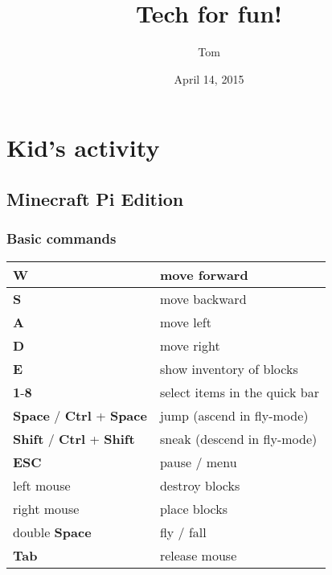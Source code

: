 \documentclass[letterpaper,10pt,english]{sphinxmanual}
\title{Tech for fun!}
\date{April 14, 2015}
\author{Tom}
\begin{document}
\maketitle
\tableofcontents
{}\label{index::doc}



\chapter{Kid's activity}
\label{index:kid-s-activity}\label{index:tech-for-fun}

\section{Minecraft Pi Edition}
\label{kid/minecraft::doc}\label{kid/minecraft:minecraft-pi-edition}

\subsection{Basic commands}
\label{kid/minecraft:basic-commands}
\begin{tabulary}{\linewidth}{|L|L|}
\hline

\textbf{W}
 & 
move forward
\\
\hline
\textbf{S}
 & 
move backward
\\
\hline
\textbf{A}
 & 
move left
\\
\hline
\textbf{D}
 & 
move right
\\
\hline
\textbf{E}
 & 
show inventory of blocks
\\
\hline
\textbf{1}-\textbf{8}
 & 
select items in the quick bar
\\
\hline
\textbf{Space} / \textbf{Ctrl} + \textbf{Space}
 & 
jump (ascend in fly-mode)
\\
\hline
\textbf{Shift} / \textbf{Ctrl} + \textbf{Shift}
 & 
sneak (descend in fly-mode)
\\
\hline
\textbf{ESC}
 & 
pause / menu
\\
\hline
left mouse
 & 
destroy blocks
\\
\hline
right mouse
 & 
place blocks
\\
\hline
double \textbf{Space}
 & 
fly / fall
\\
\hline
\textbf{Tab}
 & 
release mouse
\\
\hline\end{tabulary}
\end{document}
